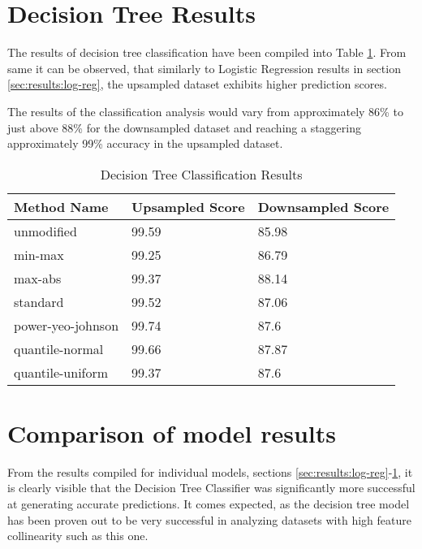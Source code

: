 \section{Decision Tree Results}\label{sec:results:decision-tree}
The results of decision tree classification have been compiled into Table \ref{tbl:results:decision-tree}. From same it can be observed, that similarly to Logistic Regression results in section \ref{sec:results:log-reg}, the upsampled dataset exhibits higher prediction scores. 

The results of the classification analysis would vary from approximately 86\% to just above 88\% for the downsampled dataset and reaching a staggering approximately 99\% accuracy in the upsampled dataset.
\begin{table}[h!]
\centering
\caption{Decision Tree Classification Results}
\label{tbl:results:decision-tree}
\begin{tabular}{@{}lll@{}}
\toprule
Method Name & Upsampled Score & Downsampled Score \\ \midrule
unmodified & 99.59 & 85.98 \\
min-max & 99.25 & 86.79 \\
max-abs & 99.37 & 88.14 \\
standard & 99.52 & 87.06 \\
power-yeo-johnson & 99.74 & 87.6 \\
quantile-normal & 99.66 & 87.87 \\
quantile-uniform & 99.37 & 87.6 \\ \bottomrule
\end{tabular}
\end{table}

\section{Comparison of model results}
From the results compiled for individual models, sections \ref{sec:results:log-reg}-\ref{sec:results:decision-tree}, it is clearly visible that the Decision Tree Classifier was significantly more successful at generating accurate predictions. It comes expected, as the decision tree model has been proven out to be very successful in analyzing datasets with high feature collinearity \cite{Bertsimas2017Cart} such as this one. 